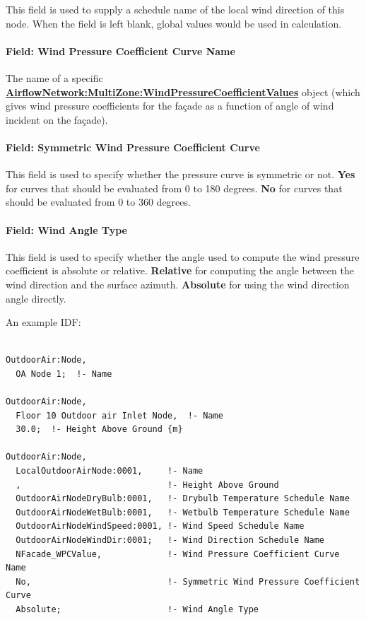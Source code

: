 This field is used to supply a schedule name of the local wind direction of this node. When the field is left blank, global values would be used in calculation.

\paragraph{Field: Wind Pressure Coefficient Curve Name}\label{field-wind-pressure-coeff-curve-name}

The name of a specific \textbf{\hyperref[airflownetworkmultizonewindpressurecoefficientvalues]{AirflowNetwork:MultiZone:WindPressureCoefficientValues}} object (which gives wind pressure coefficients for the façade as a function of angle of wind incident on the façade).

\paragraph{Field: Symmetric Wind Pressure Coefficient Curve}\label{field-sym-windp-curve-name}

This field is used to specify whether the pressure curve is symmetric or not. \textbf{Yes} for curves that should be evaluated from 0 to 180 degrees. \textbf{No} for curves that should be evaluated from 0 to 360 degrees.

\paragraph{Field: Wind Angle Type}

This field is used to specify whether the angle used to compute the wind pressure coefficient is absolute or relative. \textbf{Relative} for computing the angle between the wind direction and the surface azimuth. \textbf{Absolute} for using the wind direction angle directly.

An example IDF:

\begin{lstlisting}

OutdoorAir:Node,
  OA Node 1;  !- Name

OutdoorAir:Node,
  Floor 10 Outdoor air Inlet Node,  !- Name
  30.0;  !- Height Above Ground {m}

OutdoorAir:Node,
  LocalOutdoorAirNode:0001,     !- Name
  ,                             !- Height Above Ground
  OutdoorAirNodeDryBulb:0001,   !- Drybulb Temperature Schedule Name
  OutdoorAirNodeWetBulb:0001,   !- Wetbulb Temperature Schedule Name
  OutdoorAirNodeWindSpeed:0001, !- Wind Speed Schedule Name
  OutdoorAirNodeWindDir:0001;   !- Wind Direction Schedule Name
  NFacade_WPCValue,             !- Wind Pressure Coefficient Curve Name
  No,                           !- Symmetric Wind Pressure Coefficient Curve
  Absolute;                     !- Wind Angle Type
\end{lstlisting}

